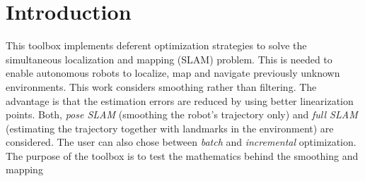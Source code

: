 \documentclass{article}
\begin{document}
\section{Introduction}
This toolbox implements deferent optimization strategies to solve the simultaneous localization and mapping (SLAM) problem. This is needed to enable autonomous robots to localize, map and navigate previously unknown environments. This work considers smoothing rather than filtering. The advantage is that the estimation errors are reduced by using 
better linearization points. Both, \emph{pose SLAM} (smoothing the robot's trajectory only) and \emph{full SLAM} (estimating the trajectory together with landmarks in the environment) are considered. The user can also chose between \emph{batch} and \emph{incremental} optimization. 
\\
The purpose of the toolbox is to test the mathematics behind the smoothing and mapping 
\\
\end{document}
